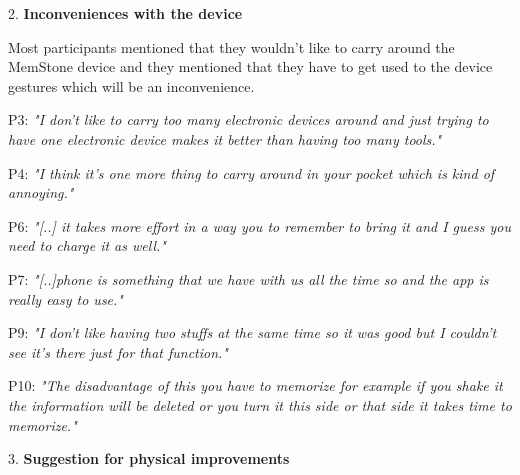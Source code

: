 \documentclass[mscthesis]{usiinfthesis}
\begin{document}
2. \textbf{Inconveniences with the device}

Most participants mentioned that they wouldn't like to carry around the MemStone device and they mentioned that they have to get used to the device gestures which will be an inconvenience.
\newline
\hspace{\parindent}\begin{adjustwidth}{1cm}{1cm}
\hspace{\parindent}P3: \textit{"I don't like to carry too many electronic devices around and just trying to have one electronic device makes it better than having too many tools."}

P4: \textit{"I think it's one more thing to carry around in your pocket which is kind of annoying."}

P6:\textit{ "[..] it takes more effort in a way you to remember to bring it and I guess you need to charge it as well."}

P7: \textit{"[..]phone is something that we have with us all the time so and the app is really easy to use."}

P9: \textit{"I don't like having two stuffs at the same time so it was good but I couldn't see it's there just for that function."}

P10:\textit{ "The disadvantage of this you have to memorize for example if you shake it the information will be deleted or you turn it this side or that side it takes time to memorize."}
\newline
\end{adjustwidth}

3. \textbf{Suggestion for physical improvements}
\end{document}
